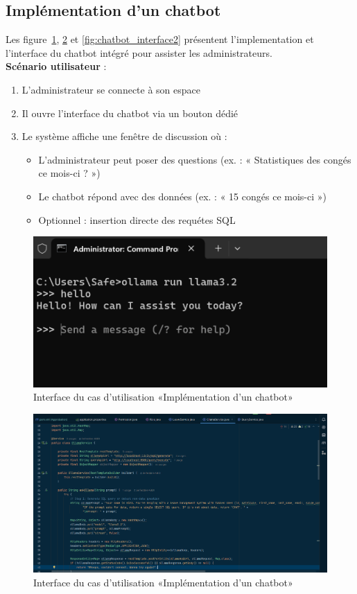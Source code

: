 \subsection{Implémentation d’un chatbot}
Les figure~\ref{fig:chatbot_interface}, \ref{fig:chatbot_interface1} et \ref{fig:chatbot_interface2} présentent l'implementation et l’interface du chatbot intégré pour assister les administrateurs. \\
\textbf{Scénario utilisateur} : 
\begin{enumerate}
    \item L’administrateur se connecte à son espace
    \item Il ouvre l’interface du chatbot via un bouton dédié
    \item Le système affiche une fenêtre de discussion où :
    \begin{itemize}
        \item L’administrateur peut poser des questions (ex. : « Statistiques des congés ce mois-ci ? »)
        \item Le chatbot répond avec des données (ex. : « 15 congés ce mois-ci »)
        \item Optionnel : insertion directe des requétes SQL
    \end{itemize}
\end{enumerate}
\begin{figure}[h]
    \centering
    \includegraphics[width=16cm]{images/realisation/ollama.png}
    \caption{Interface du cas d'utilisation «Implémentation d’un chatbot»}
    \label{fig:chatbot_interface}
\end{figure}
\begin{figure}[h]
    \centering
    \includegraphics[width=16cm]{images/realisation/ollama2.png}
    \caption{Interface du cas d'utilisation «Implémentation d’un chatbot»}
    \label{fig:chatbot_interface1}
\end{figure}
